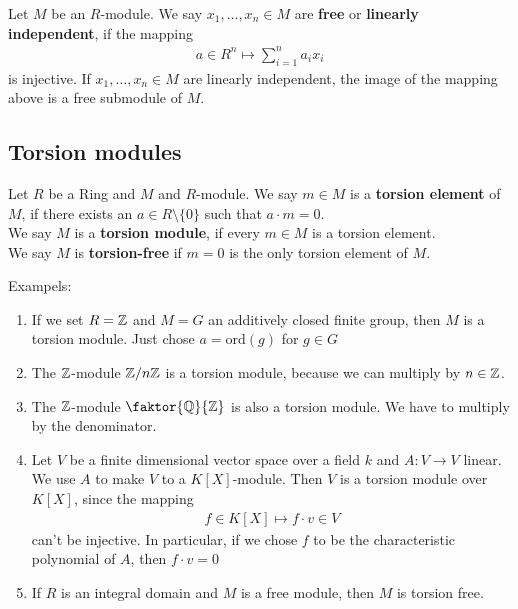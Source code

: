 \begin{definition}[]
	Let $M$ be an $R$-module. We say $x_{1}, \ldots, x_{n} \in M$ are \textbf{free} or \textbf{linearly independent}, if the mapping
	\begin{align*}
		a \in R^{n} \mapsto \sum_{i = 1}^{n} a_i x_i
	\end{align*}
	is injective. If $x_{1}, \ldots, x_{n} \in M$ are linearly independent, the image of the mapping above is a free submodule of $M$.
\end{definition}

\subsection{Torsion modules}
\begin{definition}[]
	Let $R$ be a Ring and $M$ and $R$-module. We say $m \in M$ is a \textbf{torsion element} of $M$, if there exists an $a \in R \setminus \{0\}$ such that $a \cdot m = 0$.\\

	We say $M$ is a \textbf{torsion module}, if every $m \in M$ is a torsion element.\\

	We say $M$ is \textbf{torsion-free} if $m = 0$ is the only torsion element of $M$.
\end{definition}


Exampels:
\begin{enumerate}
	\item If we set $R = \mathbb{Z}$ and $M = G$ an additively closed finite group, then $M$ is a torsion module. Just chose $a = \text{ord}(g)$ for $g \in G$
  \item The $\mathbb{Z}$-module $\mathbb{Z}/n\mathbb{Z}$ is a torsion module, because we can multiply by $n \in \mathbb{Z}$.
	\item The $\mathbb{Z}$-module $\faktor{\Q}{\Z}$ is also a torsion module. We have to multiply by the denominator.
	\item Let $V$ be a finite dimensional vector space over a field $k$ and $A: V \to V$ linear. We use $A$ to make $V$ to a $K[X]$-module. Then $V$ is a torsion module over $K[X]$, since the mapping
		\begin{align*}
			f \in K[X] \mapsto f \cdot v \in V 
		\end{align*}
		can't be injective. In particular, if we chose $f$ to be the characteristic polynomial of $A$, then $f \cdot v = 0$
	\item If $R$ is an integral domain and $M$ is a free module, then $M$ is torsion free.
\end{enumerate}



